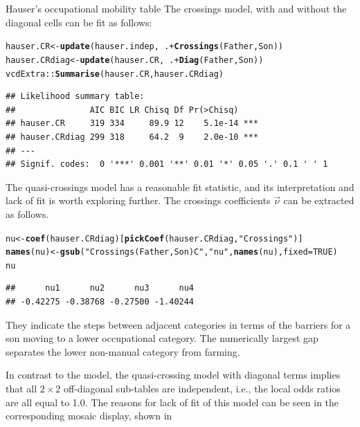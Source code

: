 \documentclass[11pt]{book}\usepackage[]{graphicx}\usepackage[]{color}
\makeatletter
\newcommand{\hlnum}[1]{\textcolor[rgb]{0.686,0.059,0.569}{#1}}%
\newcommand{\hlstr}[1]{\textcolor[rgb]{0.192,0.494,0.8}{#1}}%
\newcommand{\hlopt}[1]{\textcolor[rgb]{0,0,0}{#1}}%
\newcommand{\hlstd}[1]{\textcolor[rgb]{0.345,0.345,0.345}{#1}}%
\newcommand{\hlkwb}[1]{\textcolor[rgb]{0.69,0.353,0.396}{#1}}%
\newcommand{\hlkwc}[1]{\textcolor[rgb]{0.333,0.667,0.333}{#1}}%
\newcommand{\hlkwd}[1]{\textcolor[rgb]{0.737,0.353,0.396}{\textbf{#1}}}%
\newenvironment{kframe}{%
 \def\at@end@of@kframe{}%
 \ifinner\ifhmode%
  \def\at@end@of@kframe{\end{minipage}}%
  \begin{minipage}{\columnwidth}%
 \fi\fi%
 \def\FrameCommand##1{\hskip\@totalleftmargin \hskip-\fboxsep
 \colorbox{shadecolor}{##1}\hskip-\fboxsep
     \hskip-\linewidth \hskip-\@totalleftmargin \hskip\columnwidth}%
 \MakeFramed {\advance\hsize-\width
   \@totalleftmargin\z@ \linewidth\hsize
   \@setminipage}}%
 {\par\unskip\endMakeFramed%
 \at@end@of@kframe}
\newenvironment{knitrout}{}{} %
\renewenvironment{knitrout}{\small\renewcommand{\baselinestretch}{.85}}{} %
\makeatother
\begin{document}
\begin{Example}[hauser2]{Hauser's occupational mobility table}
The crossings model, with and without the diagonal cells can be fit as follows:
\begin{knitrout}
\color{fgcolor}\begin{kframe}
\begin{alltt}
\hlstd{hauser.CR} \hlkwb{<-} \hlkwd{update}\hlstd{(hauser.indep,} \hlopt{~} \hlstd{.} \hlopt{+} \hlkwd{Crossings}\hlstd{(Father,Son))}
\hlstd{hauser.CRdiag} \hlkwb{<-} \hlkwd{update}\hlstd{(hauser.CR,} \hlopt{~} \hlstd{.} \hlopt{+} \hlkwd{Diag}\hlstd{(Father,Son))}
\hlstd{vcdExtra::}\hlkwd{Summarise}\hlstd{(hauser.CR, hauser.CRdiag)}
\end{alltt}
\begin{verbatim}
## Likelihood summary table:
##               AIC BIC LR Chisq Df Pr(>Chisq)    
## hauser.CR     319 334     89.9 12    5.1e-14 ***
## hauser.CRdiag 299 318     64.2  9    2.0e-10 ***
## ---
## Signif. codes:  0 '***' 0.001 '**' 0.01 '*' 0.05 '.' 0.1 ' ' 1
\end{verbatim}
\end{kframe}
\end{knitrout}
The quasi-crossings model  has a reasonable \GSQ fit statistic,
and its interpretation and lack of fit is worth exploring further.
The crossings coefficients $\vec{\nu}$ can be extracted as follows.
\begin{knitrout}
\color{fgcolor}\begin{kframe}
\begin{alltt}
\hlstd{nu} \hlkwb{<-} \hlkwd{coef}\hlstd{(hauser.CRdiag)[}\hlkwd{pickCoef}\hlstd{(hauser.CRdiag,} \hlstr{"Crossings"}\hlstd{)]}
\hlkwd{names}\hlstd{(nu)} \hlkwb{<-} \hlkwd{gsub}\hlstd{(}\hlstr{"Crossings(Father, Son)C"}\hlstd{,} \hlstr{"nu"}\hlstd{,} \hlkwd{names}\hlstd{(nu),} \hlkwc{fixed}\hlstd{=}\hlnum{TRUE}\hlstd{)}
\hlstd{nu}
\end{alltt}
\begin{verbatim}
##      nu1      nu2      nu3      nu4 
## -0.42275 -0.38768 -0.27500 -1.40244
\end{verbatim}
\end{kframe}
\end{knitrout}
\noindent They indicate the steps between adjacent categories
in terms of the barriers for a son moving to a lower
occupational category.  The numerically largest gap separates
the lower non-manual category from farming.

In contrast to the  model, the quasi-crossing model with
diagonal terms implies that all $2 \times 2$ off-diagonal sub-tables
are independent, i.e., the local odds ratios are all equal to 1.0.
The reasons for lack of fit of this model can be seen in the
corresponding mosaic display, shown in 


\end{Example}
\end{document}
